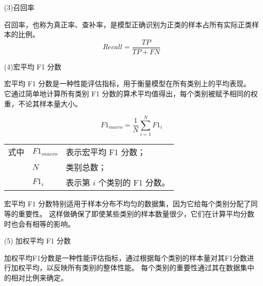 (3)召回率\par
召回率，也称为真正率、查补率，是模型正确识别为正类的样本占所有实际正类样本的比例。
\begin{equation}
	\label{eq:val_score3}
	Recall = \frac{TP}{TP + FN}
\end{equation}


(4)宏平均 F1 分数\par
宏平均 F1 分数是一种性能评估指标，用于衡量模型在所有类别上的平均表现。
它通过简单地计算所有类别 F1 分数的算术平均值得出，每个类别被赋予相同的权重，不论其样本量大小。

\begin{equation}
	\label{eq:val_score4}
	F1_{macro} = \frac{1}{N} \sum\limits_{i=1}^{N} F1_i
\end{equation}
\begin{flushleft}
	\renewcommand\arraystretch{1.25}
	\begin{tabularx}{\textwidth}{@{}>{\normalsize\rm}l@{\quad}>{\normalsize\rm}l@{——}>{\normalsize\rm}X@{}}
		式中 & $F1_{macro}$ & 表示宏平均 F1 分数；        \\
		   & $N$          & 类别总数；               \\
		   & $F1_i$       & 表示第 $i$ 个类别的 F1 分数。 \\
	\end{tabularx}\vspace{.5ex}%
\end{flushleft}

宏平均 F1 分数特别适用于样本分布不均匀的数据集，因为它给每个类别分配了同等的重要性。
这样做确保了即使某些类别的样本数量很少，它们在计算平均分数时也会有相等的影响。

(5) 加权平均 F1 分数\par
加权平均F1分数是一种性能评估指标，通过根据每个类别的样本量对其F1分数进行加权平均，以反映所有类别的整体性能。
每个类别的重要性通过其在数据集中的相对比例来确定。

